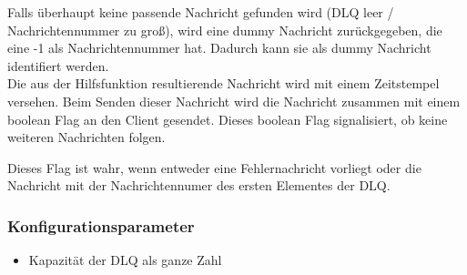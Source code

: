 \documentclass{article}
\begin{document}
Falls überhaupt keine passende Nachricht gefunden wird (DLQ leer / Nachrichtennummer zu groß), wird eine dummy Nachricht
zurückgegeben, die eine -1 als Nachrichtennummer hat. Dadurch kann sie als dummy Nachricht identifiert werden.\\

Die aus der Hilfsfunktion resultierende Nachricht wird mit einem Zeitstempel versehen. Beim Senden dieser Nachricht wird
die Nachricht zusammen mit einem boolean Flag an den Client gesendet. Dieses boolean Flag signalisiert, ob keine
weiteren Nachrichten folgen.

Dieses Flag ist wahr, wenn entweder eine Fehlernachricht vorliegt oder die Nachricht mit der Nachrichtennumer des ersten
Elementes der DLQ.

\subsubsection{Konfigurationsparameter}
\begin{itemize}
    \item Kapazität der DLQ als ganze Zahl
\end{itemize}
\end{document}
